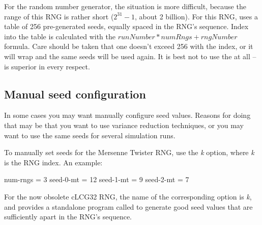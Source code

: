 For the  random number generator, the situation is more difficult,
because the range of this RNG is rather short ($2^{31}-1$, about 2 billion).
For this RNG, {\opp} uses a table of 256 pre-generated seeds, equally spaced
in the RNG's sequence. Index into the table is calculated with the
$runNumber*numRngs + rngNumber$ formula. Care should be taken that
one doesn't exceed 256 with the index, or it will wrap and the
same seeds will be used again. It is best not to use the 
at all --  is superior in every respect.


\subsection{Manual seed configuration}

In some cases you may want manually configure seed values.
Reasons for doing that may be that you want to use variance reduction
techniques, or you may want to use the same seeds for several simulation
runs.

To manually set seeds for the Mersenne Twister RNG, use the \textit{k}
option, where \textit{k} is the RNG index. An example:

\begin{inifile}
[General]
num-rngs = 3
seed-0-mt = 12
seed-1-mt = 9
seed-2-mt = 7
\end{inifile}

For the now obsolete cLCG32 RNG, the name of the corresponding option is
\textit{k}, and {\opp} provides a standalone program
called  to generate good seed values that
are sufficiently apart in the RNG's sequence.


